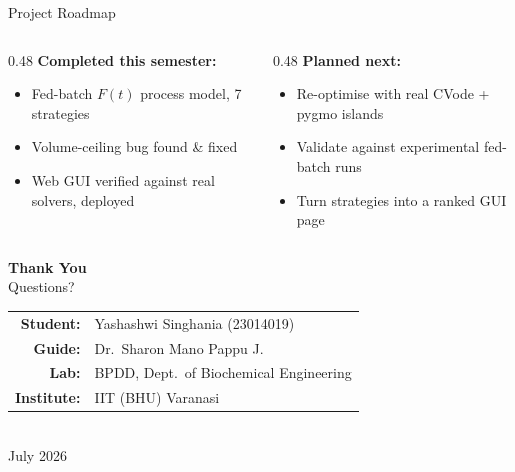 \documentclass[aspectratio=169, 11pt]{beamer}
\begin{document}
\begin{frame}{Project Roadmap}
  \vspace{0.3cm}
  \begin{columns}[T]
    \begin{column}{0.48\textwidth}
      \textbf{Completed this semester:}
      {\small
      \begin{itemize}
        \item[\textcolor{donegreen}{\checkmark}] Fed-batch $F(t)$ process model, 7 strategies
        \item[\textcolor{donegreen}{\checkmark}] Volume-ceiling bug found \& fixed
        \item[\textcolor{donegreen}{\checkmark}] Web GUI verified against real solvers, deployed
      \end{itemize}
      }
    \end{column}
    \begin{column}{0.48\textwidth}
      \textbf{Planned next:}
      {\small
      \begin{itemize}
        \item[\textcolor{accentblue}{$\circ$}] Re-optimise with real CVode + pygmo islands
        \item[\textcolor{accentblue}{$\circ$}] Validate against experimental fed-batch runs
        \item[\textcolor{accentblue}{$\circ$}] Turn strategies into a ranked GUI page
      \end{itemize}
      }
    \end{column}
  \end{columns}
\end{frame}

\begin{frame}[plain]
  \vfill
  \begin{center}
    {\LARGE\bfseries\color{darkcharcoal} Thank You}\\[0.6cm]
    {\large\color{accentblue} Questions?}\\[1cm]
    \begin{tabular}{rl}
      \textbf{Student:} & Yashashwi Singhania (23014019) \\
      \textbf{Guide:} & Dr.\ Sharon Mano Pappu J. \\
      \textbf{Lab:} & BPDD, Dept.\ of Biochemical Engineering \\
      \textbf{Institute:} & IIT (BHU) Varanasi \\
    \end{tabular}\\[0.8cm]
    {\small\color{darkcharcoal!60} July 2026}
  \end{center}
  \vfill
\end{frame}
\end{document}
